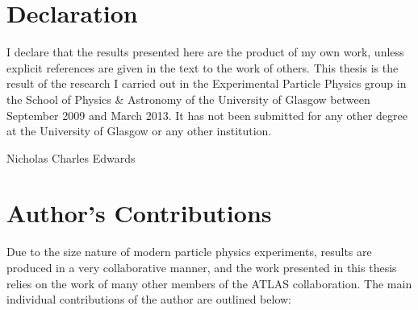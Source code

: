 \chapter*{Declaration}
I declare that the results presented here are the product of my own work, unless
explicit references are given in the text to the work of others. This thesis is
the result of the research I carried out in the Experimental Particle Physics
group in the School of Physics \& Astronomy of the University of Glasgow between
September 2009 and March 2013. It has not been submitted for any other degree
at the University of Glasgow or any other institution.

\hfill Nicholas Charles Edwards

\chapter*{Author's Contributions}

Due to the size nature of modern particle physics experiments, results are produced in a very collaborative
manner, and the work presented in this thesis relies on the work of many other
members of the ATLAS collaboration.
The main individual contributions of the author are outlined below:

